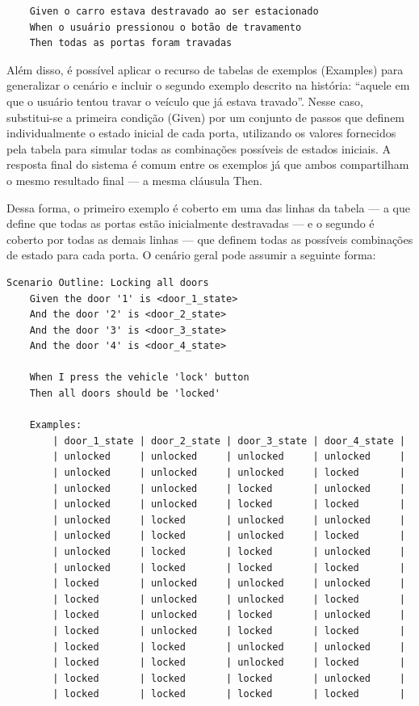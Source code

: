 \begin{verbatim}
    Given o carro estava destravado ao ser estacionado
    When o usuário pressionou o botão de travamento
    Then todas as portas foram travadas
\end{verbatim}

Além disso, é possível aplicar o recurso de tabelas de exemplos (Examples) para generalizar o cenário e incluir o segundo exemplo descrito na história: “aquele 
em que o usuário tentou travar o veículo que já estava travado”. Nesse caso, substitui-se a primeira condição (Given) por um conjunto de passos que definem 
individualmente o estado inicial de cada porta, utilizando os valores fornecidos pela tabela para simular todas as combinações possíveis de estados iniciais. 
A resposta final do sistema é comum entre os exemplos já que ambos compartilham o mesmo resultado final — a mesma cláusula Then. 

Dessa forma, o primeiro exemplo é coberto em uma das linhas da tabela — a que define que todas as portas estão inicialmente destravadas — e o segundo é coberto 
por todas as demais linhas — que definem todas as possíveis combinações de estado para cada porta. O cenário geral pode assumir a seguinte forma:

\begin{verbatim}
Scenario Outline: Locking all doors
    Given the door '1' is <door_1_state>
    And the door '2' is <door_2_state>
    And the door '3' is <door_3_state>
    And the door '4' is <door_4_state>

    When I press the vehicle 'lock' button
    Then all doors should be 'locked'

    Examples:
        | door_1_state | door_2_state | door_3_state | door_4_state |
        | unlocked     | unlocked     | unlocked     | unlocked     |
        | unlocked     | unlocked     | unlocked     | locked       |
        | unlocked     | unlocked     | locked       | unlocked     |
        | unlocked     | unlocked     | locked       | locked       |
        | unlocked     | locked       | unlocked     | unlocked     |
        | unlocked     | locked       | unlocked     | locked       |
        | unlocked     | locked       | locked       | unlocked     |
        | unlocked     | locked       | locked       | locked       |
        | locked       | unlocked     | unlocked     | unlocked     |
        | locked       | unlocked     | unlocked     | locked       |
        | locked       | unlocked     | locked       | unlocked     |
        | locked       | unlocked     | locked       | locked       |
        | locked       | locked       | unlocked     | unlocked     |
        | locked       | locked       | unlocked     | locked       |
        | locked       | locked       | locked       | unlocked     |
        | locked       | locked       | locked       | locked       |
\end{verbatim}

